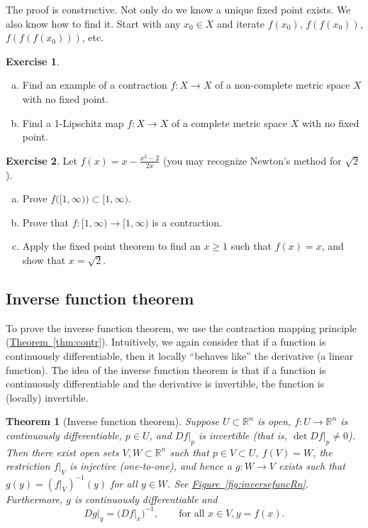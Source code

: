 \documentclass[12pt,openany]{book}
\newcommand{\R}{{\mathbb{R}}}
\newcommand{\myquote}[1]{``#1''}
\theoremstyle{plain}
\newtheorem{thm}{Theorem}[section]
\theoremstyle{remark}
\theoremstyle{definition}
\newenvironment{exbox}{%
    \def\FrameCommand{\vrule width 1pt \relax\hspace{10pt}}%
    \MakeFramed{\advance\hsize-\width\FrameRestore}%
}{%
    \endMakeFramed
}
\newenvironment{exparts}{%
    \leavevmode\begin{enumerate}[a),noitemsep,topsep=0pt,parsep=0pt,partopsep=0pt]
}{%
    \end{enumerate}
}
\theoremstyle{exercise}
\newtheorem{exercise}{Exercise}[section]
\theoremstyle{example}
\newcommand{\figureref}[1]{\hyperref[#1]{Figure~\ref*{#1}}}
\newcommand{\thmref}[1]{\hyperref[#1]{Theorem~\ref*{#1}}}
\begin{document}
The proof is constructive.  Not only do we know 
a unique fixed point exists.  We also know how to find it.  Start with
any $x_0 \in X$ and iterate $f(x_0)$,
$f(f(x_0))$,
$f(f(f(x_0)))$, etc.

\begin{exbox}
\begin{exercise}
\begin{exparts}
\item
Find an example of a contraction $f \colon X \to X$
of a non-complete metric space $X$ with no
fixed point.
\item
Find a 1-Lipschitz map $f \colon X \to X$ of a complete metric space $X$ with no fixed point.
\end{exparts}
\end{exercise}

\begin{exercise}
Let $f(x) = x-\frac{x^2-2}{2x}$ (you may recognize Newton's method for
$\sqrt{2}$).
\begin{exparts}
\item
Prove $f\bigl([1,\infty)\bigr) \subset [1,\infty)$.
\item
Prove that $f \colon [1,\infty) \to [1,\infty)$ is a contraction.
\item
Apply the fixed point theorem to find an $x \geq 1$ such that
$f(x) = x$, and show that $x = \sqrt{2}$.
\end{exparts}
\end{exercise}
\end{exbox}

\subsection{Inverse function theorem}
\label{subsec:svinvfuncthm}

To prove the inverse function theorem, we use the contraction mapping
principle (\thmref{thm:contr}).
Intuitively, we again consider that if a function is continuously differentiable, then it
locally \myquote{behaves like} the derivative (a linear function).
The idea of the inverse function theorem is that if a function is
continuously differentiable and the derivative is invertible, the function is
(locally) invertible.

\begin{thm}[Inverse function theorem]
\label{thm:inverse}
Suppose $U \subset \R^n$ is open, 
$f \colon U \to \R^n$ is continuously differentiable, $p \in U$, and $Df|_p$ is invertible
(that is, $\det Df|_p \not=0$).
Then there exist open sets $V, W \subset \R^n$ such that
$p \in V \subset U$, $f(V) = W$, the restriction $f|_V$ is injective (one-to-one),
and hence a $g \colon W \to V$ exists such that
$g(y) = (f|_V)^{-1}(y)$ for all $y \in W$.
See \figureref{fig:inversefuncRn}.
Furthermore, $g$ is continuously differentiable
and 
\begin{equation*}
Dg|_y = {\bigl(Df|_x\bigr)}^{-1}, \qquad \text{for all } x \in V, y = f(x).
\end{equation*}
\end{thm}
\end{document}

